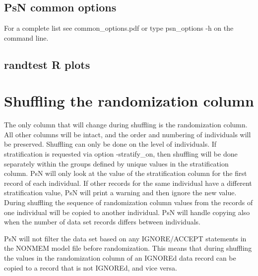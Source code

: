 \subsection{PsN common options}
For a complete list see common\_options.pdf or type psn\_options -h on the command line.

\subsection{randtest R plots}
\newcommand{\rplotsconditions}{See section Output, subsections Basic and Extended R plots, for descriptions of the default randtest R plots. The default randtest template requires that option -base\_model was used, that input (full) model has more THETAs than base (reduced) model, and that the additional THETAs are the ones relevant for the randomization column. For basic R plots it is required that R libraries xpose4 and grid are installed. Extended R plots also require that R libraries
ggplot2, tidyr, gridExtra, scales, MASS and plotrix are installed. If the conditions are not fulfilled then no pdf will be generated, see the .Rout file in the main run directory for error messages.}


\section{Shuffling the randomization column}
The only column that will change during shuffling is the randomization column. All other columns will be intact, and the order and numbering of individuals will be preserved. Shuffling can only be done on the level of individuals. If stratification is requested via option -stratify\_on, then shuffling will be done separately within the groups defined by unique values in the stratification column. PsN will only look at the value of the stratification column for the first record of each individual. If other records for the same individual have a different stratification value, PsN will print a warning and then ignore the new value.
During shuffling the sequence of randomization column values from the records of one individual will be copied to another individual. PsN will handle copying also when the number of data set records differs between individuals.

PsN will not filter the data set based on any IGNORE/ACCEPT statements in the NONMEM model file before randomization. This means that during shuffling the values in the randomization column of an IGNOREd data record can be copied to a record that is not IGNOREd, and vice versa.

